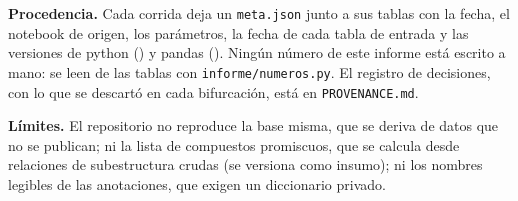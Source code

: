 \documentclass[11pt,a4paper]{article}
\begin{document}
\textbf{Procedencia.} Cada corrida deja un \texttt{meta.json} junto a sus tablas
con la fecha, el notebook de origen, los parámetros, la fecha de cada tabla de
entrada y las versiones de python (\VersionPython) y pandas (\VersionPandas).
Ningún número de este informe está escrito a mano: se leen de las tablas con
\texttt{informe/numeros.py}. El registro de decisiones, con lo que se descartó
en cada bifurcación, está en \texttt{PROVENANCE.md}.

\textbf{Límites.} El repositorio no reproduce la base misma, que se deriva de
datos que no se publican; ni la lista de compuestos promiscuos, que se calcula desde
relaciones de subestructura crudas (se versiona como insumo); ni los nombres legibles de las anotaciones, que exigen
un diccionario privado.



\end{document}
